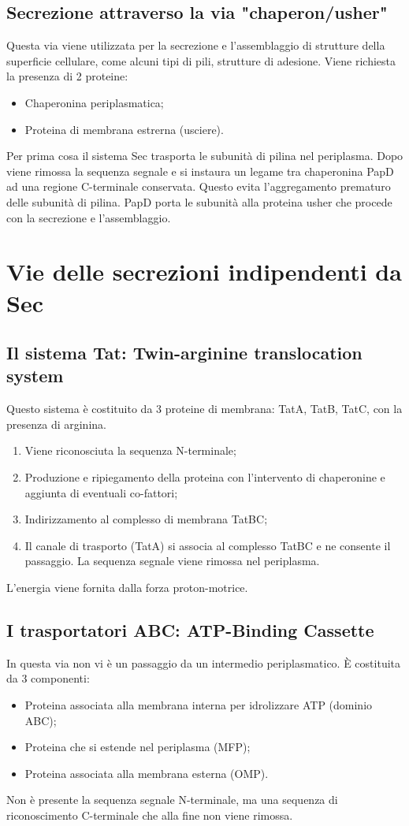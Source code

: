 \subsection{Secrezione attraverso la via "chaperon/usher"}
Questa via viene utilizzata per la secrezione e l'assemblaggio di strutture della superficie cellulare, come alcuni tipi di pili, strutture di adesione. Viene richiesta la presenza di 2 proteine:
\begin{itemize}
    \item Chaperonina periplasmatica; 
    \item Proteina di membrana estrerna (usciere).
\end{itemize}
Per prima cosa il sistema Sec trasporta le subunit\`a di pilina nel periplasma. Dopo viene rimossa la sequenza segnale e si instaura un legame tra chaperonina PapD ad una regione C-terminale conservata. Questo evita l'aggregamento prematuro delle subunit\`a di pilina. PapD porta le subunit\`a alla proteina usher che procede con la secrezione e l'assemblaggio.
\section{Vie delle secrezioni indipendenti da Sec}
\subsection{Il sistema Tat: Twin-arginine translocation system}
Questo sistema \`e costituito da 3 proteine di membrana: TatA, TatB, TatC, con la presenza di arginina. 
\begin{enumerate}
    \item Viene riconosciuta la sequenza N-terminale; 
    \item Produzione e ripiegamento della proteina con l'intervento di chaperonine e aggiunta di eventuali co-fattori; 
    \item Indirizzamento al complesso di membrana TatBC; 
    \item Il canale di trasporto  (TatA) si associa al complesso TatBC e ne consente il passaggio. La sequenza segnale viene rimossa nel periplasma. 
\end{enumerate}
L'energia viene fornita dalla forza proton-motrice. 
\subsection{I trasportatori ABC: ATP-Binding Cassette}
In questa via non vi \`e un passaggio da un intermedio periplasmatico. \`E costituita da 3 componenti:
\begin{itemize}
    \item Proteina associata alla membrana interna per idrolizzare ATP (dominio ABC); 
    \item Proteina che si estende nel periplasma (MFP); 
    \item Proteina associata alla membrana esterna (OMP).
\end{itemize}
Non \`e presente la sequenza segnale N-terminale, ma una sequenza di riconoscimento C-terminale che alla fine non viene rimossa. 
